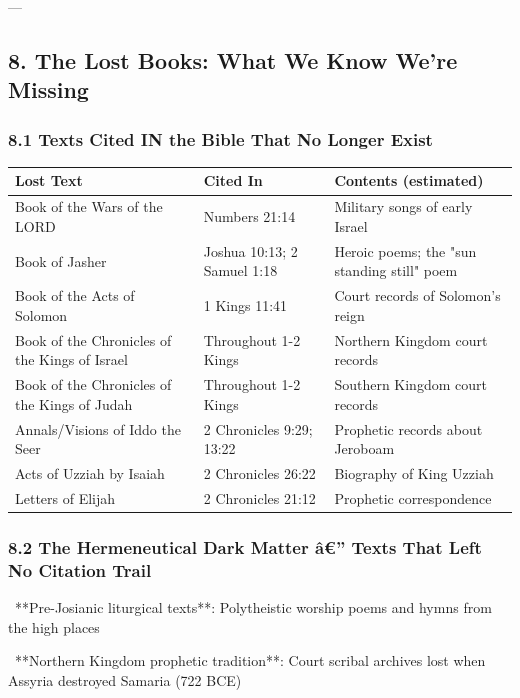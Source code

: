 \documentclass[aps,prd,11pt,onecolumn,superscriptaddress,nofootinbib,floatfix]{revtex4-2}
\begin{document}
---


\subsection{8. The Lost Books: What We Know We're Missing}


\subsubsection{8.1 Texts Cited IN the Bible That No Longer Exist}


\begin{table}[h!]
\centering
\begin{tabular}{p{3cm}p{3cm}p{3cm}}
\hline
Lost Text & Cited In & Contents (estimated) \\
\hline
Book of the Wars of the LORD & Numbers 21:14 & Military songs of early Israel \\
Book of Jasher & Joshua 10:13; 2 Samuel 1:18 & Heroic poems; the "sun standing still" poem \\
Book of the Acts of Solomon & 1 Kings 11:41 & Court records of Solomon's reign \\
Book of the Chronicles of the Kings of Israel & Throughout 1-2 Kings & Northern Kingdom court records \\
Book of the Chronicles of the Kings of Judah & Throughout 1-2 Kings & Southern Kingdom court records \\
Annals/Visions of Iddo the Seer & 2 Chronicles 9:29; 13:22 & Prophetic records about Jeroboam \\
Acts of Uzziah by Isaiah & 2 Chronicles 26:22 & Biography of King Uzziah \\
Letters of Elijah & 2 Chronicles 21:12 & Prophetic correspondence \\
\hline
\end{tabular}
\end{table}



\subsubsection{8.2 The Hermeneutical Dark Matter â€'' Texts That Left No Citation Trail}


\textbullet~**Pre-Josianic liturgical texts**: Polytheistic worship poems and hymns from the high places

\textbullet~**Northern Kingdom prophetic tradition**: Court scribal archives lost when Assyria destroyed Samaria (722 BCE)
\end{document}
